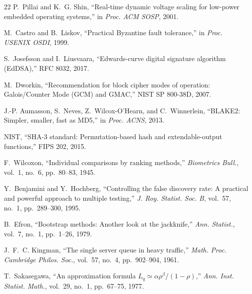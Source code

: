 \documentclass[11pt,journal,onecolumn]{IEEEtran}
\begin{document}
\begin{thebibliography}{22}
P.~Pillai and K.~G. Shin, ``Real-time dynamic voltage scaling for low-power embedded operating systems,'' in \emph{Proc. ACM SOSP}, 2001.

M.~Castro and B.~Liskov, ``Practical Byzantine fault tolerance,'' in \emph{Proc. USENIX OSDI}, 1999.

S.~Josefsson and I.~Liusvaara, ``Edwards-curve digital signature algorithm (EdDSA),'' RFC 8032, 2017.

M.~Dworkin, ``Recommendation for block cipher modes of operation: Galois/Counter Mode (GCM) and GMAC,'' NIST SP 800-38D, 2007.

J.-P. Aumasson, S.~Neves, Z.~Wilcox-O'Hearn, and C.~Winnerlein, ``BLAKE2: Simpler, smaller, fast as MD5,'' in \emph{Proc. ACNS}, 2013.

NIST, ``SHA-3 standard: Permutation-based hash and extendable-output functions,'' FIPS 202, 2015.

F.~Wilcoxon, ``Individual comparisons by ranking methods,'' \emph{Biometrics Bull.}, vol.~1, no.~6, pp.~80--83, 1945.

Y.~Benjamini and Y.~Hochberg, ``Controlling the false discovery rate: A practical and powerful approach to multiple testing,'' \emph{J. Roy. Statist. Soc. B}, vol.~57, no.~1, pp.~289--300, 1995.

B.~Efron, ``Bootstrap methods: Another look at the jackknife,'' \emph{Ann. Statist.}, vol.~7, no.~1, pp.~1--26, 1979.

J.~F.~C. Kingman, ``The single server queue in heavy traffic,'' \emph{Math. Proc. Cambridge Philos. Soc.}, vol.~57, no.~4, pp.~902--904, 1961.

T.~Sakasegawa, ``An approximation formula $L_q \simeq \alpha\rho^{\beta}/(1-\rho)$,'' \emph{Ann. Inst. Statist. Math.}, vol.~29, no.~1, pp.~67--75, 1977.

\end{thebibliography}
\end{document}
